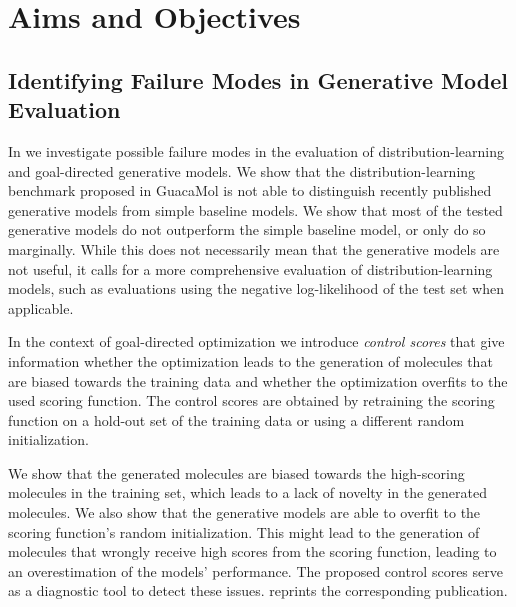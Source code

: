 \section{Aims and Objectives\label{sec:aims-objectives}}
\subsection{Identifying Failure Modes in Generative Model Evaluation}
In \citep{renzFailureModesMolecule2019} we investigate possible failure modes in the evaluation of
distribution-learning and goal-directed generative models. We show that the distribution-learning
benchmark proposed in GuacaMol \citep{brownGuacaMolBenchmarkingModels2019} is not able to
distinguish recently published generative models from simple baseline models. We show that most of
the tested generative models do not outperform the simple baseline model, or only do so marginally.
While this does not necessarily mean that the generative models are not useful, it calls for a more
comprehensive evaluation of distribution-learning models, such as evaluations using the negative
log-likelihood of the test set when applicable.

In the context of goal-directed optimization we introduce \emph{control scores} that give
information whether the optimization leads to the generation of molecules that are biased towards the
training data and whether the optimization overfits to the used scoring function.
The control scores are obtained by retraining the scoring function on a hold-out set of the training
data or using a different random initialization.

We show that the generated molecules are biased towards the high-scoring molecules in the training
set, which leads to a lack of novelty in the generated molecules. We also show that the generative
models are able to overfit to the scoring function's random initialization. This might lead to the
generation of molecules that wrongly receive high scores from the scoring function, leading to an
overestimation of the models' performance. The proposed control scores serve as a diagnostic tool to
detect these issues.  reprints the corresponding publication.


